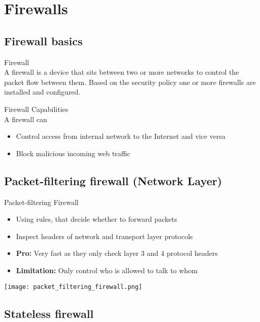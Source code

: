 \section{Firewalls}

\subsection{Firewall basics}

\begin{definition}{Firewall}\\
    A firewall is a device that sits between two or more networks to control the packet flow between them. Based on the security policy one or more firewalls are installed and configured.
\end{definition}

\begin{concept}{Firewall Capabilities}\\
    A firewall can
    \begin{itemize}
        \item Control access from internal network to the Internet and vice versa
        \item Block malicious incoming web traffic
    \end{itemize}
\end{concept}

\subsection{Packet-filtering firewall (Network Layer)}

\begin{definition}{Packet-filtering Firewall}\\
    \begin{itemize}
        \item Using rules, that decide whether to forward packets
        \item Inspect headers of network and transport layer protocols
        \item \textbf{Pro:} Very fast as they only check layer 3 and 4 protocol headers
        \item \textbf{Limitation:} Only control who is allowed to talk to whom
    \end{itemize}
\end{definition}

\texttt{[image: packet\_filtering\_firewall.png]}

\subsection{Stateless firewall}

